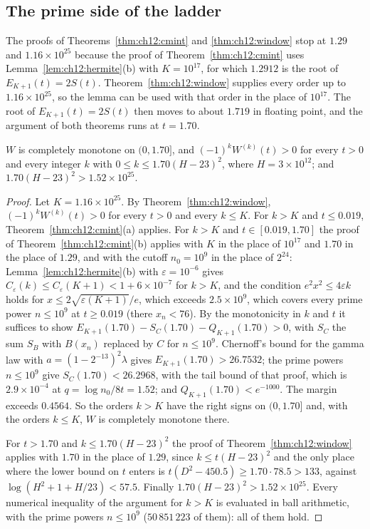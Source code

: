 \subsection{The prime side of the ladder}\label{sec:ps:ladder}

The proofs of Theorems~\ref{thm:ch12:cmint} and \ref{thm:ch12:window} stop at $1.29$ and $1.16\times10^{25}$ because the proof of Theorem~\ref{thm:ch12:cmint} uses Lemma~\ref{lem:ch12:hermite}(b) with $K=10^{17}$, for which $1.2912$ is the root of $E_{K+1}(t)=2S(t)$. Theorem~\ref{thm:ch12:window} supplies every order up to $1.16\times10^{25}$, so the lemma can be used with that order in the place of $10^{17}$. The root of $E_{K+1}(t)=2S(t)$ then moves to about $1.719$ in floating point, and the argument of both theorems runs at $t=1.70$.

\begin{theorem}\label{ps:thm:free}
$W$ is completely monotone on $(0,1.70]$, and $(-1)^kW^{(k)}(t)>0$ for every $t>0$ and every integer $k$ with $0\le k\le1.70(H-23)^2$, where $H=3\times10^{12}$; and $1.70(H-23)^2>1.52\times10^{25}$.
\end{theorem}

\begin{proof}
Let $K=1.16\times10^{25}$. By Theorem~\ref{thm:ch12:window}, $(-1)^kW^{(k)}(t)>0$ for every $t>0$ and every $k\le K$. For $k>K$ and $t\le0.019$, Theorem~\ref{thm:ch12:cmint}(a) applies. For $k>K$ and $t\in[0.019,1.70]$ the proof of Theorem~\ref{thm:ch12:cmint}(b) applies with $K$ in the place of $10^{17}$ and $1.70$ in the place of $1.29$, and with the cutoff $n_0=10^9$ in the place of $2^{24}$: Lemma~\ref{lem:ch12:hermite}(b) with $\varepsilon=10^{-6}$ gives $C_\varepsilon(k)\le C_\varepsilon(K+1)<1+6\times10^{-7}$ for $k>K$, and the condition $e^2x^2\le4\varepsilon k$ holds for $x\le2\sqrt{\varepsilon(K+1)}/e$, which exceeds $2.5\times10^9$, which covers every prime power $n\le10^9$ at $t\ge0.019$ (there $x_n<76$). By the monotonicity in $k$ and $t$ it suffices to show $E_{K+1}(1.70)-S_C(1.70)-Q_{K+1}(1.70)>0$, with $S_C$ the sum $S_B$ with $B(x_n)$ replaced by $C$ for $n\le10^9$. Chernoff's bound for the gamma law with $a=(1-2^{-13})^2\lambda$ gives $E_{K+1}(1.70)>26.7532$; the prime powers $n\le10^9$ give $S_C(1.70)<26.2968$, with the tail bound of that proof, which is $2.9\times10^{-4}$ at $q=\log n_0/8t=1.52$; and $Q_{K+1}(1.70)<e^{-1000}$. The margin exceeds $0.4564$. So the orders $k>K$ have the right signs on $(0,1.70]$ and, with the orders $k\le K$, $W$ is completely monotone there.

For $t>1.70$ and $k\le1.70(H-23)^2$ the proof of Theorem~\ref{thm:ch12:window} applies with $1.70$ in the place of $1.29$, since $k\le t(H-23)^2$ and the only place where the lower bound on $t$ enters is $t(D^2-450.5)\ge1.70\cdot78.5>133$, against $\log(H^2+1+H/23)<57.5$. Finally $1.70(H-23)^2>1.52\times10^{25}$. Every numerical inequality of the argument for $k>K$ is evaluated in ball arithmetic, with the prime powers $n\le10^9$ ($50\,851\,223$ of them): all of them hold.
\end{proof}

